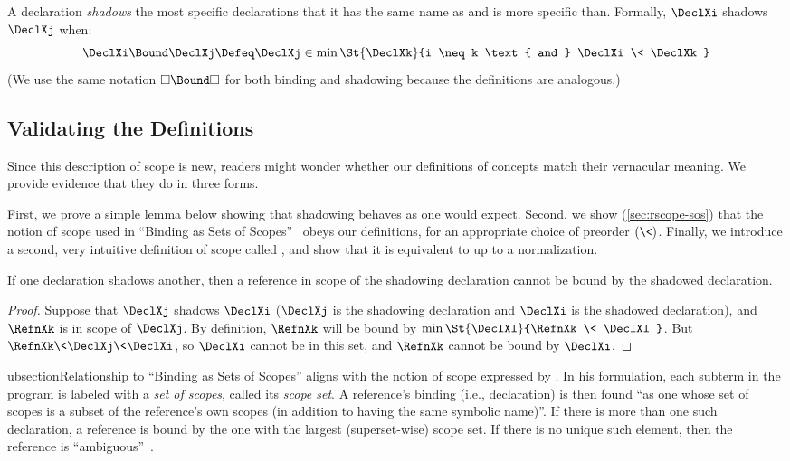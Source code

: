 \begin{definition}[Shadowing]
  \label{def:rscope-shadow}
  A declaration \emph{shadows} the most specific declarations that it
  has the same name as and is more specific than. Formally, $\DeclXi$
  shadows $\DeclXj$ when:
  \[ \DeclXi \Bound \DeclXj \Defeq
  \DeclXj \in \min \St{\DeclXk}{i \neq k \text{ and } \DeclXi \< \DeclXk}
  \]
(We use the same notation $\square \Bound \square$ for both binding
and shadowing because the definitions are analogous.)
\end{definition}

\subsection{Validating the Definitions}
Since this description of scope is new, readers might wonder
whether our definitions of concepts match their vernacular meaning.
We provide evidence that they do in three forms.

First, we prove a simple lemma below showing that shadowing
behaves as one would expect.
Second, we show (\cref{sec:rscope-sos}) that the notion of scope used in
``Binding as Sets of Scopes''~\cite{flatt:scope} obeys our {\sap}
definitions, for an appropriate choice of preorder $(\<)$.
Finally, we introduce a second, very intuitive definition of
scope called {\sas}, and show that it is equivalent to {\sap} up to
a normalization.

\begin{lemma}[Shadowing]
  If one declaration shadows another, then a reference in scope of the
  shadowing declaration cannot be bound by the shadowed declaration.
\end{lemma}
\begin{proof}
  Suppose that $\DeclXj$ shadows $\DeclXi$ ($\DeclXj$ is the shadowing
  declaration and $\DeclXi$ is the shadowed declaration), and
  $\RefnXk$ is in scope of $\DeclXj$.
  By definition, $\RefnXk$ will be bound by
  $\min \St{\DeclXl}{\RefnXk \< \DeclXl}$.  But $\RefnXk \<
  \DeclXj \< \DeclXi$, so $\DeclXi$ cannot be in this set, and $\RefnXk$
  cannot be bound by $\DeclXi$.
\end{proof}

ubsection{Relationship to ``Binding as Sets of Scopes''}
\label{sec:rscope-sos}
{\Sap} aligns with the notion of scope expressed by \cite{flatt:scope}.
In his formulation,
each subterm in the program is labeled with a \emph{set of scopes},
called its \emph{scope set}. A reference's binding (i.e., declaration)
is then found ``as one whose set of scopes is a subset of the
reference's own scopes (in addition to having the same symbolic
name)''. If there is more than one such declaration, a reference is
bound by the one with the largest (superset-wise) scope set. If there
is no unique such element, then the reference is
``ambiguous''~\cite[pp. 3]{flatt:scope}.


